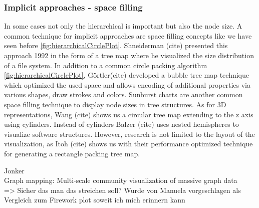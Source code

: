 \subsubsection{Implicit approaches - space filling}
In some cases not only the hierarchical is important but also the node size. A common technique for implicit approaches are space filling concepts like we have seen before \ref{fig:hierarchicalCirclePlot}.
Shneiderman (cite) presented this approach 1992 in the form of a tree map where he visualized the size distribution of a file system. In addition to a common circle packing algorithm \ref{fig:hierarchicalCirclePlot}, Görtler(cite) developed a bubble tree map technique which optimized the used space and allows encoding of additional properties via various shapes, draw strokes and colors. Sunburst charts are another common space filling technique to display node sizes in tree structures. 
As for 3D representations, Wang (cite) shows us a circular tree map extending to the z axis using cylinders. Instead of cylinders Balzer (cite) uses nested hemispheres to visualize software structures. 
However, research is not limited to the layout of the visualization, as Itoh (cite) shows us with their performance optimized technique for generating a rectangle packing tree map.

Jonker\\
Graph mapping: Multi-scale community visualization of massive graph data\\
=> Sicher das man das streichen soll? Wurde von Manuela vorgeschlagen als Vergleich zum Firework plot soweit ich mich erinnern kann

